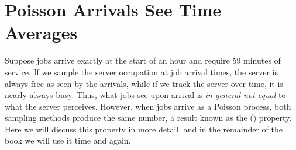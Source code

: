 \documentclass[stochastic-or.tex]{subfiles}
\begin{document}
\section{Poisson Arrivals See Time Averages}
\label{sec:poisson-arrivals-see}

Suppose jobs arrive exactly at the start of an hour and require 59 minutes of service.
If we sample the server occupation at job arrival times, the server is always free as seen by the arrivals, while if we track the server over time, it is nearly always busy.
Thus, what jobs see upon arrival is \emph{in general not equal} to what the server perceives.
However, when jobs arrive as a Poisson process, both sampling methods produce the same number, a result known as the  () property.
Here we will discuss this property in more detail, and in the remainder of the book we will use it time and again.
\end{document}
